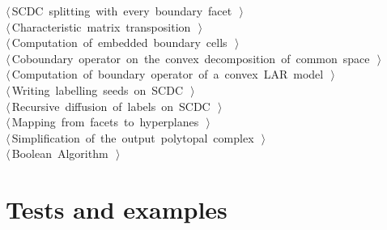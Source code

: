 \documentclass[11pt,oneside]{article}	%
\begin{document}
\begin{flushleft}
\begin{list}{}{}
\mbox{}\verb@@\hbox{$\langle\,$SCDC splitting with every boundary facet\nobreak\ {\footnotesize {}}$\,\rangle$}\verb@@\\
\mbox{}\verb@@\hbox{$\langle\,$Characteristic matrix transposition\nobreak\ {\footnotesize {}}$\,\rangle$}\verb@@\\
\mbox{}\verb@@\hbox{$\langle\,$Computation of embedded boundary cells\nobreak\ {\footnotesize {}}$\,\rangle$}\verb@@\\
\mbox{}\verb@@\hbox{$\langle\,$Coboundary operator on the convex decomposition of common space\nobreak\ {\footnotesize {}}$\,\rangle$}\verb@@\\
\mbox{}\verb@@\hbox{$\langle\,$Computation of boundary operator of a convex LAR model\nobreak\ {\footnotesize {}}$\,\rangle$}\verb@@\\
\mbox{}\verb@@\hbox{$\langle\,$Writing labelling seeds on SCDC\nobreak\ {\footnotesize {}}$\,\rangle$}\verb@@\\
\mbox{}\verb@@\hbox{$\langle\,$Recursive diffusion of labels on SCDC\nobreak\ {\footnotesize {}}$\,\rangle$}\verb@@\\
\mbox{}\verb@@\hbox{$\langle\,$Mapping from facets to hyperplanes\nobreak\ {\footnotesize {}}$\,\rangle$}\verb@@\\
\mbox{}\verb@@\hbox{$\langle\,$Simplification of the output polytopal complex\nobreak\ {\footnotesize {}}$\,\rangle$}\verb@@\\
\mbox{}\verb@@\hbox{$\langle\,$Boolean Algorithm\nobreak\ {\footnotesize {}}$\,\rangle$}\verb@@\\
\mbox{}\verb@@{\NWsep}
\end{list}
\vspace{-2ex}
\end{flushleft}




\section{Tests and examples}
\end{document}
